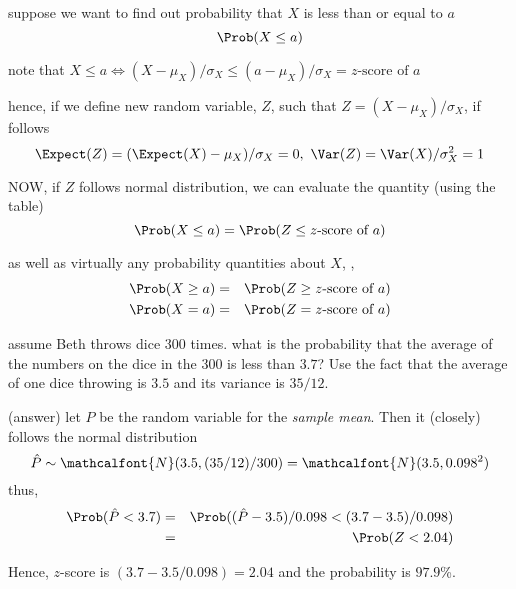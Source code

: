 \documentclass[17pt,landscape]{foils}
\newcommand\normal{\mathcalfont{N}}
\begin{document}
{

\bit

	\item suppose we want to find out probability that $X$ is less than or equal to $a$
%
	\[
		\Prob(X\leq a)
	\]


	\vitem note that
%
	$
		X\leq a
		\Leftrightarrow
		(X-\mu_X)/\sigma_X \leq (a-\mu_X)/\sigma_X = \mbox{$z$-score of $a$}
	$

	\vitem hence, if we define new random variable, $Z$, such that $Z=(X-\mu_X)/\sigma_X$,
		if follows
	\[
		\Expect (Z) = (\Expect (X) - \mu_X)/\sigma_X = 0,\ %
		\Var (Z) = \Var (X) / \sigma_X^2 = 1
	\]

	\vitem NOW, if $Z$ follows normal distribution, we can evaluate the quantity (using the table)
	\[
		\Prob(X\leq a) = \Prob(Z \leq \mbox{$z$-score of $a$})
	\]

		as well as virtually any probability quantities about $X$, \eg,
	\begin{eqnarray*}
		\Prob(X\geq a) &=& \Prob(Z \geq \mbox{$z$-score of $a$})
		\\
		\Prob(X= a) &=& \Prob(Z = \mbox{$z$-score of $a$})
	\end{eqnarray*}
\eit


%

\bit
	\item assume Beth throws dice $300$ times.
		what is the probability that the average of the numbers on the dice in the $300$
		is {less than} $3.7$?
		Use the fact that the average of one dice throwing is $3.5$
		and its variance is $35/12$.

	\bit
		\vitem (answer) let $\hat{P}$ be the random variable for the \emph{sample mean}. Then
			it (closely) follows the normal distribution
			\[
				\hat{P} \sim \normal ( 3.5, (35/12)/300)
				= \normal ( 3.5, 0.098^2)
			\]
			thus,
			\begin{eqnarray*}
				\Prob(\hat{P} < 3.7) &=& \Prob((\hat{P} - 3.5)/0.098 < (3.7-3.5)/0.098)
				\\
				&=& \Prob(Z < 2.04)
			\end{eqnarray*}

		Hence, $z$-score is $(3.7-3.5/0.098) = 2.04$ and the probability is $97.9$\%.
	\eit
\eit


}
\end{document}
